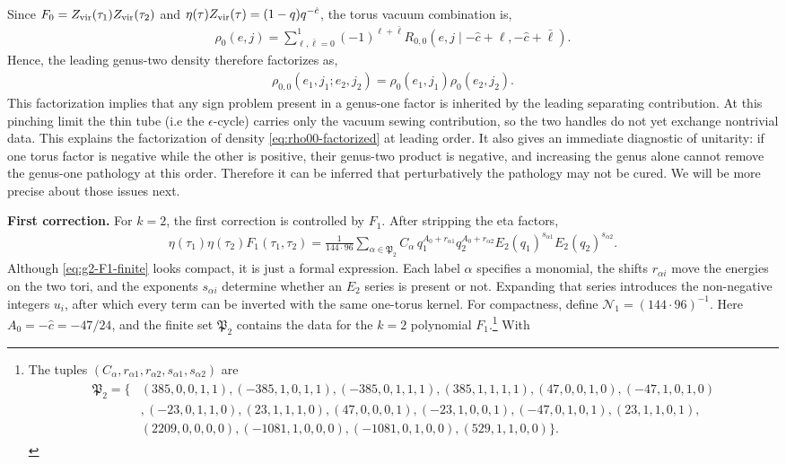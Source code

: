 \documentclass[12 pt]{article}
\begin{document}
\noindent
Since $F_0=Z_{\rm vir}(\tau_1)Z_{\rm vir}(\tau_2)$ and
$\eta(\tau)Z_{\rm vir}(\tau)=(1-q)q^{-\hat c}$, the torus vacuum combination is,
\begin{align}
    \rho_0(e,j)
    =
    \sum_{\ell,\bar\ell=0}^{1}
    (-1)^{\ell+\bar\ell}
    R_{0,0}\!\left(
    e,j\mid-\hat c+\ell,-\hat c+\bar\ell
    \right).
    \label{eq:rho0-fourterms}
\end{align}
Hence, the leading genus-two density therefore factorizes as,
\begin{align}
    \rho_{0,0}(e_1,j_1;e_2,j_2)
    =\rho_0(e_1,j_1)\rho_0(e_2,j_2).
    \label{eq:rho00-factorized}
\end{align}
This factorization implies that any sign problem present in a genus-one factor is inherited by the leading separating contribution. At this pinching limit the thin tube (i.e the $\epsilon$-cycle) carries only the vacuum sewing contribution, so the two handles do not yet exchange nontrivial data.  This explains the factorization of density \eqref{eq:rho00-factorized} at leading order.  It also gives an immediate diagnostic of unitarity: if one torus factor is negative while the other is positive, their genus-two product is negative, and increasing the genus alone cannot remove the genus-one pathology at this order. Therefore it can be inferred that perturbatively the pathology may not be cured. We will be more precise about those issues next. \\ \par
\textbf{First correction.}
For $k=2$, the first correction is controlled by $F_1$. After stripping the eta factors,
\begin{align}
\eta(\tau_1)\eta(\tau_2)F_1(\tau_1,\tau_2)
	    =  \frac{1}{144\cdot96}
	    \sum_{\alpha\in\mathfrak P_2}
	    C_\alpha\,
	    q_1^{A_0+r_{\alpha 1}}
	    q_2^{A_0+r_{\alpha 2}}
	    E_2(q_1)^{s_{\alpha 1}}
	    E_2(q_2)^{s_{\alpha 2}}.
	    \label{eq:g2-F1-finite}
\end{align}
Although \eqref{eq:g2-F1-finite} looks compact, it is just a formal expression.  Each label $\alpha$ specifies a monomial, the shifts $r_{\alpha i}$ move the energies on the two tori, and the exponents $s_{\alpha i}$ determine whether an $E_2$ series is present or not.  Expanding that series introduces the non-negative integers $u_i$, after which every term can be inverted with the same one-torus kernel.
For compactness, define $\mathcal N_1=(144\cdot96)^{-1}$.
		Here \(A_0=-\hat c=-47/24\), and the finite set \(\mathfrak P_2\) contains the data for the \(k=2\) polynomial \(F_1\).\footnote{The tuples \((C_\alpha,r_{\alpha1},r_{\alpha2},s_{\alpha1},s_{\alpha2})\) are
		\begin{align}
		\begin{split}
		\mathfrak P_2=\{&
	(385,0,0,1,1),(-385,1,0,1,1),(-385,0,1,1,1),(385,1,1,1,1),
	(47,0,0,1,0),(-47,1,0,1,0)\\&,(-23,0,1,1,0),(23,1,1,1,0),
	(47,0,0,0,1),(-23,1,0,0,1),(-47,0,1,0,1),(23,1,1,0,1),\\ &
		(2209,0,0,0,0),(-1081,1,0,0,0),(-1081,0,1,0,0),(529,1,1,0,0)\}.
		\end{split}
		\end{align}
		} With
\end{document}
